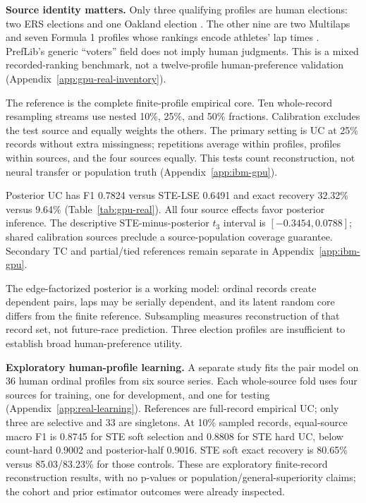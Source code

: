 \textbf{Source identity matters.} Only three qualifying profiles are human elections: two ERS elections and one Oakland election \citep{preflibers,oneill2013openstv}. The other nine are two Multilaps and seven Formula 1 profiles whose rankings encode athletes' lap times \citep{boehmer2022collecting}. PrefLib's generic ``voters'' field does not imply human judgments. This is a mixed recorded-ranking benchmark, not a twelve-profile human-preference validation (Appendix~\ref{app:gpu-real-inventory}).

The reference is the complete finite-profile empirical core. Ten whole-record resampling streams use nested 10\%, 25\%, and 50\% fractions. Calibration excludes the test source and equally weights the others. The primary setting is UC at 25\% records without extra missingness; repetitions average within profiles, profiles within sources, and the four sources equally. This tests count reconstruction, not neural transfer or population truth (Appendix~\ref{app:ibm-gpu}).

\begin{table}[t]\centering\small

\caption{Strict selective recorded UC reconstruction at the frozen 25\%-record setting: three election and nine sports profiles, four equally weighted sources. Score methods use source-excluded absolute calibration; GFM and hard/all/none controls use native decisions. Exact is complete-set recovery.}
\label{tab:gpu-real}\end{table}

Posterior UC has F1 0.7824 versus STE-LSE 0.6491 and exact recovery 32.32\% versus 9.64\% (Table~\ref{tab:gpu-real}). All four source effects favor posterior inference. The descriptive STE-minus-posterior $t_3$ interval is $[-0.3454,0.0788]$; shared calibration sources preclude a source-population coverage guarantee. Secondary TC and partial/tied references remain separate in Appendix~\ref{app:ibm-gpu}.

The edge-factorized posterior is a working model: ordinal records create dependent pairs, laps may be serially dependent, and its latent random core differs from the finite reference. Subsampling measures reconstruction of that record set, not future-race prediction. Three election profiles are insufficient to establish broad human-preference utility.

\textbf{Exploratory human-profile learning.} A separate study fits the pair model on 36 human ordinal profiles from six source series. Each whole-source fold uses four sources for training, one for development, and one for testing (Appendix~\ref{app:real-learning}). References are full-record empirical UC; only three are selective and 33 are singletons. At 10\% sampled records, equal-source macro F1 is 0.8745 for STE soft selection and 0.8808 for STE hard UC, below count-hard 0.9002 and posterior-half 0.9016. STE soft exact recovery is 80.65\% versus 85.03/83.23\% for those controls. These are exploratory finite-record reconstruction results, with no p-values or population/general-superiority claims; the cohort and prior estimator outcomes were already inspected.

